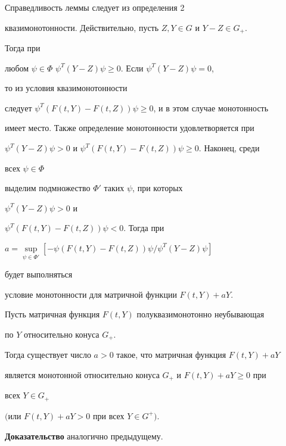 \begin{pf} 


Справедливость леммы следует из определения 2 


квазимонотонности. Действительно, пусть $Z,Y\in G$ и $Y-Z\in G_+$. 


Тогда при 


любом $\psi\in\Phi$\; $\psi^T(Y-Z)\psi\ge0$. Если $\psi^T(Y-Z)\psi=0$, 


то из условия квазимонотонности 


следует $\psi^T(F(t,Y)-F(t,Z))\psi\ge0$, и в этом случае монотонность 


имеет место. Также определение монотонности удовлетворяется при 


$\psi^T(Y-Z)\psi>0$ и $\psi^T(F(t,Y)-F(t,Z))\psi\ge0$. Наконец, среди 


всех $\psi\in\Phi$ 


выделим подмножество $\Phi'$ таких $\psi$, при которых 


$\psi^T(Y-Z)\psi>0$ и 


$\psi^T(F(t,Y)-F(t,Z))\psi<0$. Тогда при 


$a=\sup\limits_{\psi\in\Phi'}[-\psi(F(t,Y)-F(t,Z))\psi/\psi^T 


(Y-Z)\psi]$ 


будет выполняться 


условие монотонности для матричной функции $F(t,Y)+a Y$. 


\end{pf} 


 


\begin{lem} 


Пусть матричная функция $F(t,Y)$ полуквазимонотонно неубывающая 


по $Y$ относительно конуса $G_+$. 


Тогда существует число $a>0$ такое, что матричная функция $F(t,Y)+a Y$ 


является монотонной относительно конуса $G_+$ и $F(t,Y)+a Y\ge0$ при 


всех $Y\in G_+$ 


$($или $F(t,Y)+a Y>0$ при всех $Y\in G^+)$. 


\end{lem} 


 


{\bf Доказательство} аналогично предыдущему. 


